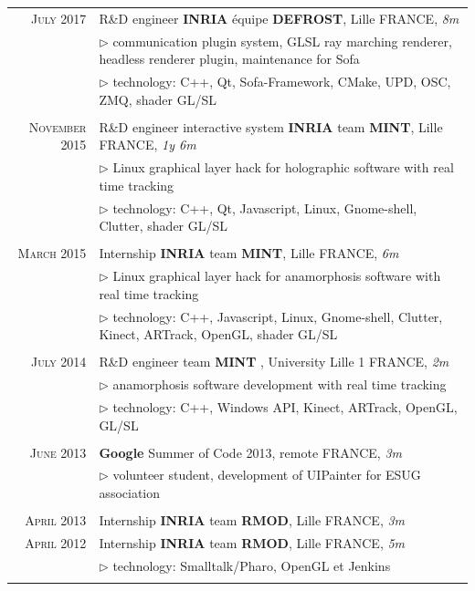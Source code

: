 \documentclass[9pt]{article}
\begin{document}
\begin{tabular}{rl}
	\textsc{July} 2017& R\&D engineer \textbf{INRIA} équipe \textbf{DEFROST}, {\small Lille FRANCE, \textit{8m}}\\
        &{$\rhd$ \small communication plugin system, GLSL ray marching renderer, headless renderer plugin, maintenance for Sofa}\\	
        &{$\rhd$ \small technology: C++, Qt, Sofa-Framework, CMake, UPD, OSC, ZMQ, shader GL/SL}\\ &\\
                  
	\textsc{November} 2015& R\&D engineer interactive system \textbf{INRIA} team \textbf{MINT}, {\small Lille FRANCE, \textit{1y 6m}}\\
        &{$\rhd$ \small Linux graphical layer hack for holographic software with real time tracking}\\	
        &{$\rhd$ \small technology: C++, Qt, Javascript, Linux, Gnome-shell, Clutter, shader GL/SL}\\ &\\
       
	\textsc{March} 2015& Internship \textbf{INRIA} team \textbf{MINT}, {\small Lille FRANCE, \textit{6m}}\\
        &{$\rhd$ \small Linux graphical layer hack for anamorphosis software with real time tracking}\\
        &{$\rhd$ \small technology: C++, Javascript, Linux, Gnome-shell, Clutter, Kinect, ARTrack, OpenGL, shader GL/SL}\\ &\\
       
	\textsc{July} 2014& R\&D engineer team \textbf{MINT} , {\small University Lille 1 FRANCE, \textit{2m}}\\
        &{$\rhd$ \small anamorphosis software development with real time tracking}\\
        &{$\rhd$ \small technology: C++, Windows API, Kinect, ARTrack, OpenGL, GL/SL}\\ &\\
        
	\textsc{June} 2013& \textbf{Google} Summer of Code 2013, {\small remote FRANCE, \textit{3m}}\\
        &{$\rhd$ \small volunteer student, development of UIPainter for ESUG association}\\ &\\
        
	\textsc{April} 2013& Internship \textbf{INRIA} team \textbf{RMOD}, {\small Lille FRANCE, \textit{3m}}\\
	\textsc{April} 2012& Internship \textbf{INRIA} team \textbf{RMOD}, {\small Lille FRANCE, \textit{5m}}\\
        &{$\rhd$ \small technology: Smalltalk/Pharo, OpenGL et Jenkins}\\ &\\
\end{tabular}
\newpage
%
%
\end{document}
